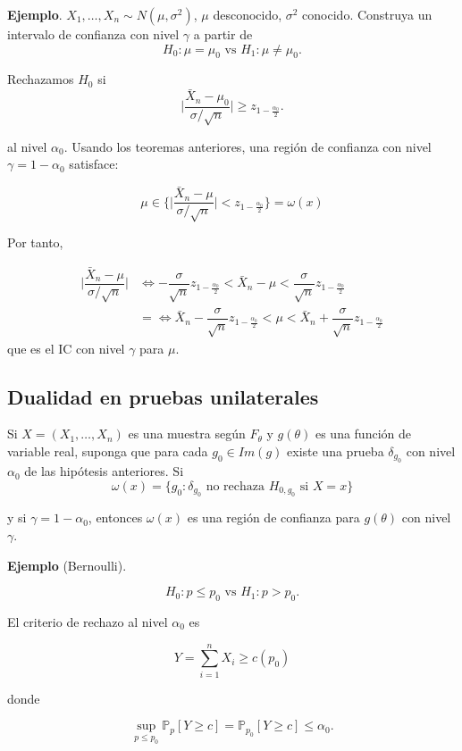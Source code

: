 \documentclass[
  12pt,
]{book}
\begin{document}
\textbf{Ejemplo}. \(X_1,\dots,X_n\sim N(\mu,\sigma^2)\), \(\mu\) desconocido, \(\sigma^2\) conocido. Construya un intervalo de confianza con nivel \(\gamma\) a partir de \[ H_0: \mu = \mu_0 \text{ vs } H_1: \mu \ne \mu_0.\]

Rechazamos \(H_0\) si
\[\bigg|\dfrac{\bar X_n-\mu_0}{\sigma/\sqrt n}\bigg|\geq z_{1-\frac{\alpha_0}2}.\]

al nivel \(\alpha_0\). Usando los teoremas anteriores, una región de confianza con nivel \(\gamma = 1-\alpha_0\) satisface:

\[\mu\in\bigg\{ \bigg|\dfrac{\bar X_n-\mu}{\sigma/\sqrt n}\bigg|< z_{1-\frac{\alpha_0}2}\bigg\} = \omega(x)\]

Por tanto,

\begin{align*}
 \bigg|\dfrac{\bar X_n-\mu}{\sigma/\sqrt n}\bigg| & \Leftrightarrow -\dfrac{\sigma}{\sqrt n}z_{1-\frac{\alpha_0}2}<\bar X_n  - \mu<\dfrac{\sigma}{\sqrt n}z_{1-\frac{\alpha_0}2}\\
 & = \Leftrightarrow \bar X_n-\dfrac{\sigma}{\sqrt n}z_{1-\frac{\alpha_0}2}< \mu<\bar X_n + \dfrac{\sigma}{\sqrt n}z_{1-\frac{\alpha_0}2}
\end{align*}
que es el IC con nivel \(\gamma\) para \(\mu\).

\hypertarget{dualidad-en-pruebas-unilaterales}{%
\subsection{Dualidad en pruebas unilaterales}\label{dualidad-en-pruebas-unilaterales}}

Si \(X = (X_1,\dots, X_n)\) es una muestra según \(F_\theta\) y \(g(\theta)\) es una función de variable real, suponga que para cada \(g_0\in Im(g)\) existe una prueba \(\delta_{g_0}\) con nivel \(\alpha_0\) de las hipótesis anteriores. Si
\[\omega(x) = \{g_0: \delta_{g_0} \text{ no rechaza }H_{0,g_0}\text{ si }X=x\}\]

y si \(\gamma = 1-\alpha_0\), entonces \(\omega(x)\) es una región de confianza para \(g(\theta)\) con nivel \(\gamma\).

\textbf{Ejemplo} (Bernoulli).

\[ H_0: p \leq p_0 \text{ vs } H_1: p>p_0.\]

El criterio de rechazo al nivel \(\alpha_0\) es

\[Y = \sum_{i=1}^nX_i\geq c(p_0)\]

donde

\[\sup_{p\leq p_0} \mathbb P_p[Y\geq c] = \mathbb P_{p_0}[Y\geq c] \leq \alpha_0.\]
\end{document}
